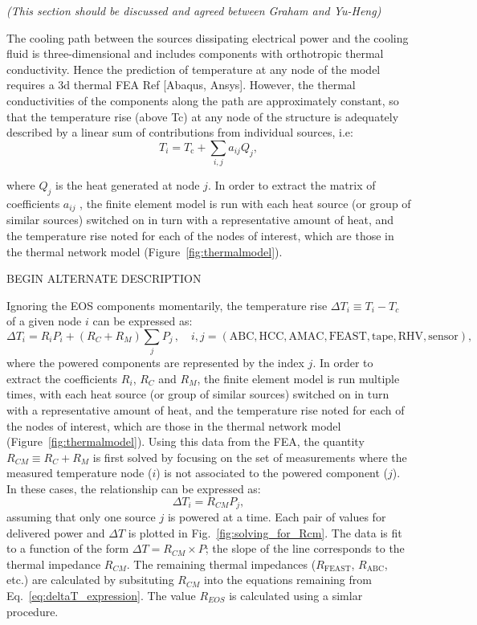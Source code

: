 \textit{(This section should be discussed and agreed between Graham and Yu-Heng)}

The cooling path between the sources dissipating electrical power and the cooling fluid is three-dimensional and includes components with orthotropic thermal conductivity. Hence the prediction of temperature at any node of the model requires a 3d thermal FEA Ref [Abaqus, Ansys]. However, the thermal conductivities of the components along the path are approximately constant, so that the temperature rise (above Tc) at any node of the structure is adequately described by a linear sum of contributions from individual sources, i.e:
\begin{equation}
T_i  =   T_\text{c}  +  \sum_{i,j} a_{ij} Q_{j},
\end{equation}

where $Q_j$ is the heat generated at node $j$. In order to extract the matrix of coefficients $a_{ij}$ , the finite element model is run with each heat source (or group of similar sources) switched on in turn with a representative amount of heat, and the temperature rise noted for each of the nodes of interest, which are those in the thermal network model (Figure~\ref{fig:thermalmodel}).  

BEGIN ALTERNATE DESCRIPTION


Ignoring the EOS components momentarily, the temperature rise $\Delta T_i \equiv T_i - T_c$ of a given node $i$ can be expressed as:
\begin{equation}
\Delta T_i = R_i P_i + \left(R_{C} + R_{M}\right)\sum_j P_j\,, \quad i,j=(\text{ABC},\text{HCC},\text{AMAC},\text{FEAST},\text{tape},\text{RHV},\text{sensor}),
\label{eq:deltaT_expression}
\end{equation}
where the powered components are represented by the index $j$.
In order to extract the coefficients $R_{i}$, $R_{C}$ and $R_{M}$,
the finite element model is run multiple times, with each heat source (or group of similar sources)
switched on in turn with a representative amount of heat, and the temperature rise
noted for each of the nodes of interest, which are those in the thermal network model (Figure~\ref{fig:thermalmodel}).
%
Using this data from the FEA, the quantity $R_{CM}\equiv R_{C} + R_{M}$ is first solved by
focusing on the set of measurements where the measured temperature node ($i$)
is not associated to the powered component ($j$).
In these cases, the relationship can be expressed as:
\begin{equation}
\Delta T_i = R_{CM} P_j,
\end{equation}
assuming that only one source $j$ is powered at a time.
Each pair of values for delivered power and $\Delta T$ is plotted in Fig.~\ref{fig:solving_for_Rcm}.
The data is fit to a function of the form $\Delta T = R_{CM} \times P$;
the slope of the line corresponds to the thermal impedance $R_{CM}$.
The remaining thermal impedances ($R_\text{FEAST}$, $R_\text{ABC}$, etc.) are calculated by
subsituting $R_{CM}$ into the equations remaining from Eq.~\ref{eq:deltaT_expression}.
The value $R_{EOS}$ is calculated using a simlar procedure.

